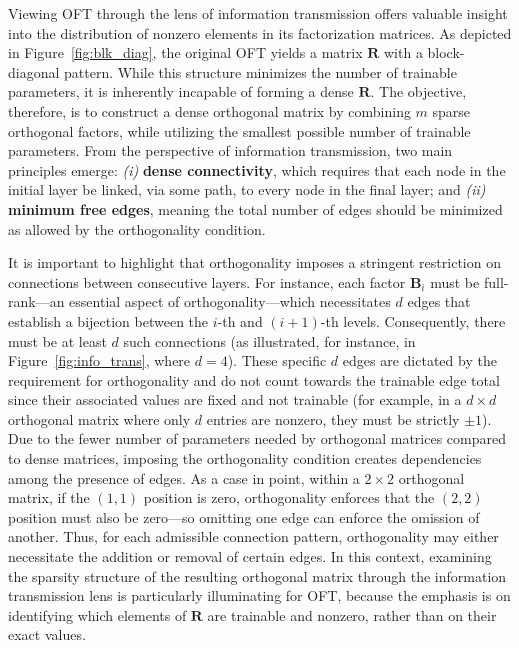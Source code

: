 Viewing OFT through the lens of information transmission offers valuable insight into the distribution of nonzero elements in its factorization matrices. As depicted in Figure~\ref{fig:blk_diag}, the original OFT yields a matrix $\bm{R}$ with a block-diagonal pattern. While this structure minimizes the number of trainable parameters, it is inherently incapable of forming a dense $\bm{R}$. The objective, therefore, is to construct a dense orthogonal matrix by combining $m$ sparse orthogonal factors, while utilizing the smallest possible number of trainable parameters. From the perspective of information transmission, two main principles emerge: \emph{(i)} \textbf{dense connectivity}, which requires that each node in the initial layer be linked, via some path, to every node in the final layer; and \emph{(ii)} \textbf{minimum free edges}, meaning the total number of edges should be minimized as allowed by the orthogonality condition. 

It is important to highlight that orthogonality imposes a stringent restriction on connections between consecutive layers. For instance, each factor $\bm{B}_i$ must be full-rank—an essential aspect of orthogonality—which necessitates $d$ edges that establish a bijection between the $i$-th and $(i+1)$-th levels. Consequently, there must be at least $d$ such connections (as illustrated, for instance, in Figure~\ref{fig:info_trans}, where $d = 4$). These specific $d$ edges are dictated by the requirement for orthogonality and do not count towards the trainable edge total since their associated values are fixed and not trainable (for example, in a $d\times d$ orthogonal matrix where only $d$ entries are nonzero, they must be strictly $\pm 1$). Due to the fewer number of parameters needed by orthogonal matrices compared to dense matrices, imposing the orthogonality condition creates dependencies among the presence of edges. As a case in point, within a $2\times 2$ orthogonal matrix, if the $(1,1)$ position is zero, orthogonality enforces that the $(2,2)$ position must also be zero—so omitting one edge can enforce the omission of another. Thus, for each admissible connection pattern, orthogonality may either necessitate the addition or removal of certain edges. In this context, examining the sparsity structure of the resulting orthogonal matrix through the information transmission lens is particularly illuminating for OFT, because the emphasis is on identifying which elements of $\bm{R}$ are trainable and nonzero, rather than on their exact values.

